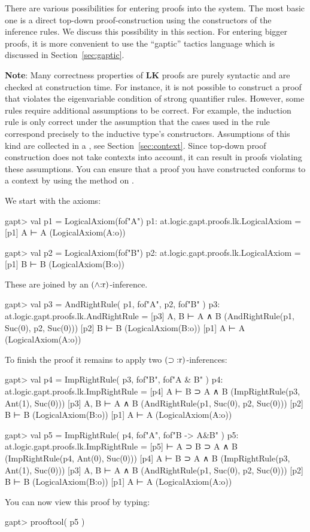 \documentclass[a4paper,11pt]{book}
\newcommand{\impl}{\supset} %
\renewcommand{\land}{\wedge}
\newcommand{\LK}{\textbf{LK}}
\newcommand{\mt}[1]{\textnormal{#1}}
\newcommand{\cli}[1]{{\ttfamily {#1}}}
\begin{document}
There are various possibilities for entering proofs into the system. The most
basic one is a direct top-down proof-construction using the constructors
of the inference rules. We discuss this possibility in this section. For
entering bigger proofs, it is more convenient to use the ``gaptic'' tactics
language which is discussed in Section~\ref{sec:gaptic}.

\textbf{Note}: Many correctness properties of {\LK} proofs are purely syntactic 
and are checked at construction time. For instance, it is not
possible to construct a proof that violates the eigenvariable condition
of strong quantifier rules. However, some rules require additional
assumptions to be correct. For example, the induction rule is only
correct under the assumption that the cases used in the rule
correspond precisely to the inductive type's constructors. Assumptions
of this kind are collected in a \cli{Context}, see Section~\ref{sec:context}.
Since top-down proof construction does not take contexts into account,
it can result in proofs violating these assumptions. You can ensure that
a proof you have constructed conforms to a context \cli{ctx} by using the
\cli{check} method on \cli{ctx}.

We start with the axioms:
%
\begin{clilisting}
gapt> val p1 = LogicalAxiom(fof"A")
p1: at.logic.gapt.proofs.lk.LogicalAxiom =
[p1] A ⊢ A    (LogicalAxiom(A:o))

gapt> val p2 = LogicalAxiom(fof"B")
p2: at.logic.gapt.proofs.lk.LogicalAxiom =
[p1] B ⊢ B    (LogicalAxiom(B:o))

\end{clilisting}
%
These are joined by an $(\land\mt{:r})$-inference.
\begin{clilisting}
gapt> val p3 = AndRightRule( p1, fof"A", p2, fof"B" )
p3: at.logic.gapt.proofs.lk.AndRightRule =
[p3] A, B ⊢ A ∧ B    (AndRightRule(p1, Suc(0), p2, Suc(0)))
[p2] B ⊢ B    (LogicalAxiom(B:o))
[p1] A ⊢ A    (LogicalAxiom(A:o))

\end{clilisting}
%
To finish the proof it remains to apply two $(\impl\mt{:r})$-inferences:
%
\begin{clilisting}
gapt> val p4 = ImpRightRule( p3, fof"B", fof"A & B" )
p4: at.logic.gapt.proofs.lk.ImpRightRule =
[p4] A ⊢ B ⊃ A ∧ B    (ImpRightRule(p3, Ant(1), Suc(0)))
[p3] A, B ⊢ A ∧ B    (AndRightRule(p1, Suc(0), p2, Suc(0)))
[p2] B ⊢ B    (LogicalAxiom(B:o))
[p1] A ⊢ A    (LogicalAxiom(A:o))

gapt> val p5 = ImpRightRule( p4, fof"A", fof"B -> A&B" )
p5: at.logic.gapt.proofs.lk.ImpRightRule =
[p5]  ⊢ A ⊃ B ⊃ A ∧ B    (ImpRightRule(p4, Ant(0), Suc(0)))
[p4] A ⊢ B ⊃ A ∧ B    (ImpRightRule(p3, Ant(1), Suc(0)))
[p3] A, B ⊢ A ∧ B    (AndRightRule(p1, Suc(0), p2, Suc(0)))
[p2] B ⊢ B    (LogicalAxiom(B:o))
[p1] A ⊢ A    (LogicalAxiom(A:o))

\end{clilisting}
%
You can now view this proof by typing:
\begin{clilisting}
gapt> prooftool( p5 )

\end{clilisting}
\end{document}
